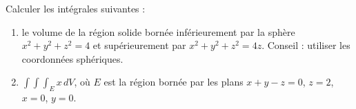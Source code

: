 \begin{exercice}\label{exodevoir2-0009}

Calculer les intégrales suivantes : 
\begin{enumerate}
\item le volume de la région solide bornée inférieurement par la sphère $x^2+y^2+z^2=4$ et supérieurement par $x^2+y^2+z^2=4z$.  Conseil : utiliser les coordonnées sphériques.
\item $\displaystyle \int\int\int_{E}x \,dV $, où $E$ est la région bornée par les plans $x+y-z=0$, $z=2$, $x=0$, $y=0$.
\end{enumerate}

\end{exercice}
